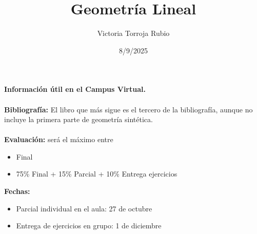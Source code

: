 \documentclass{report}
\begin{document}
\title{Geometría Lineal}
\author{Victoria Torroja Rubio}
\date{8/9/2025}

\maketitle

\tableofcontents

\pagebreak

\textbf{Información útil en el Campus Virtual.} \\ \\
\textbf{Bibliografía:} El libro que más sigue es el tercero de la bibliografía, aunque no incluye la primera parte de geometría sintética. \\ \\
\textbf{Evaluación:} será el máximo entre
\begin{itemize}
\item Final
\item 75\% Final + 15\% Parcial + 10\% Entrega ejercicios
\end{itemize}
\textbf{Fechas:} 
\begin{itemize}
\item Parcial individual en el aula: 27 de octubre
\item Entrega de ejercicios en grupo: 1 de diciembre
\end{itemize}




\end{document}
